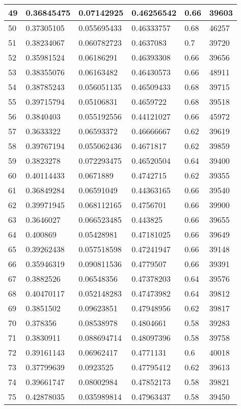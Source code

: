 \begin{longtable}{|l|l|l|l|l|l|}
49 & 0.36845475 & 0.07142925 & 0.46256542 & 0.66 & 39603 \\ \hline 
50 & 0.37305105 & 0.055695433 & 0.46333757 & 0.68 & 46257 \\ \hline 
51 & 0.38234067 & 0.060782723 & 0.4637083 & 0.7 & 39720 \\ \hline 
52 & 0.35981524 & 0.06186291 & 0.46393308 & 0.66 & 39656 \\ \hline 
53 & 0.38355076 & 0.06163482 & 0.46430573 & 0.66 & 48911 \\ \hline 
54 & 0.38785243 & 0.056051135 & 0.46509433 & 0.68 & 39715 \\ \hline 
55 & 0.39715794 & 0.05106831 & 0.4659722 & 0.68 & 39518 \\ \hline 
56 & 0.3840403 & 0.055192556 & 0.44121027 & 0.66 & 45972 \\ \hline 
57 & 0.3633322 & 0.06593372 & 0.46666667 & 0.62 & 39619 \\ \hline 
58 & 0.39767194 & 0.055062436 & 0.4671817 & 0.62 & 39859 \\ \hline 
59 & 0.3823278 & 0.072293475 & 0.46520504 & 0.64 & 39400 \\ \hline 
60 & 0.40114433 & 0.0671889 & 0.4742715 & 0.62 & 39355 \\ \hline 
61 & 0.36849284 & 0.06591049 & 0.44363165 & 0.66 & 39540 \\ \hline 
62 & 0.39971945 & 0.068112165 & 0.4756701 & 0.66 & 39900 \\ \hline 
63 & 0.3646027 & 0.066523485 & 0.443825 & 0.66 & 39655 \\ \hline 
64 & 0.400869 & 0.05428981 & 0.47181025 & 0.66 & 39649 \\ \hline 
65 & 0.39262438 & 0.057518598 & 0.47241947 & 0.66 & 39148 \\ \hline 
66 & 0.35946319 & 0.090811536 & 0.4779507 & 0.66 & 39391 \\ \hline 
67 & 0.3882526 & 0.06548356 & 0.47378203 & 0.64 & 39576 \\ \hline 
68 & 0.40470117 & 0.052148283 & 0.47473982 & 0.64 & 39812 \\ \hline 
69 & 0.3851502 & 0.09623851 & 0.47948956 & 0.62 & 39817 \\ \hline 
70 & 0.378356 & 0.08538978 & 0.4804661 & 0.58 & 39283 \\ \hline 
71 & 0.3830911 & 0.088694714 & 0.48097396 & 0.58 & 39758 \\ \hline 
72 & 0.39161143 & 0.06962417 & 0.4771131 & 0.6 & 40018 \\ \hline 
73 & 0.37799639 & 0.0923525 & 0.47795412 & 0.62 & 39613 \\ \hline 
74 & 0.39661747 & 0.08002984 & 0.47852173 & 0.58 & 39821 \\ \hline 
75 & 0.42878035 & 0.035989814 & 0.47963437 & 0.58 & 39450 \\ \hline 
\end{longtable}